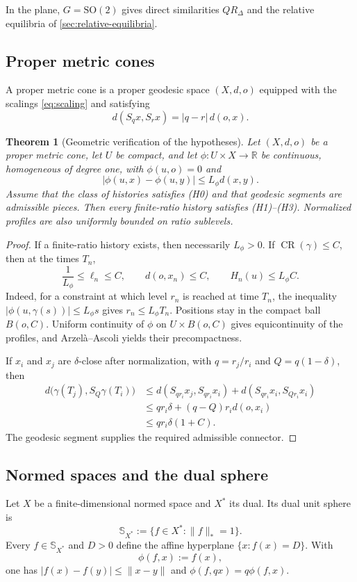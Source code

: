 \documentclass[10pt,a4paper]{article}
\newtheorem{theorem}{Theorem}[section]
\theoremstyle{definition}
\theoremstyle{remark}
\DeclareMathOperator{\CR}{CR}
\newcommand{\R}{\mathbb{R}}
\newcommand{\Sph}{\mathbb{S}}
\newcommand{\norm}[1]{\lVert #1\rVert}
\newcommand{\abs}[1]{\lvert #1\rvert}
\begin{document}
In the plane, $G=\mathrm{SO}(2)$ gives direct similarities $QR_\Delta$ and the relative equilibria of \cref{sec:relative-equilibria}.

\subsection{Proper metric cones}
A proper metric cone is a proper geodesic space $(X,d,o)$ equipped with the scalings \eqref{eq:scaling} and satisfying
\begin{equation}
d(S_qx,S_rx)=\abs{q-r}\,d(o,x).
\label{eq:metric-cone}
\end{equation}

\begin{theorem}[Geometric verification of the hypotheses]
\label{thm:metric-cone}
Let $(X,d,o)$ be a proper metric cone, let $U$ be compact, and let $\phi:U\times X\to\R$ be continuous, homogeneous of degree one, with $\phi(u,o)=0$ and
\[
\abs{\phi(u,x)-\phi(u,y)}\le L_\phi d(x,y).
\]
Assume that the class of histories satisfies \emph{(H0)} and that geodesic segments are admissible pieces. Then every finite-ratio history satisfies \emph{(H1)--(H3)}. Normalized profiles are also uniformly bounded on ratio sublevels.
\end{theorem}

\begin{proof}
If a finite-ratio history exists, then necessarily $L_\phi>0$. If $\CR(\gamma)\le C$, then at the times $T_n$,
\[
\frac{1}{L_\phi}\le\ell_n\le C,
\qquad
d(o,x_n)\le C,
\qquad
H_n(u)\le L_\phi C.
\]
Indeed, for a constraint at which level $r_n$ is reached at time $T_n$, the inequality $\abs{\phi(u,\gamma(s))}\le L_\phi s$ gives $r_n\le L_\phi T_n$. Positions stay in the compact ball $B(o,C)$. Uniform continuity of $\phi$ on $U\times B(o,C)$ gives equicontinuity of the profiles, and Arzel\`a--Ascoli yields their precompactness.

If $x_i$ and $x_j$ are $\delta$-close after normalization, with $q=r_j/r_i$ and $Q=q(1-\delta)$, then
\begin{align*}
d\bigl(\gamma(T_j),S_Q\gamma(T_i)\bigr)
&\le d(S_{qr_i}x_j,S_{qr_i}x_i)
   +d(S_{qr_i}x_i,S_{Qr_i}x_i)\\
&\le qr_i\delta+(q-Q)r_i d(o,x_i)\\
&\le qr_i\delta(1+C).
\end{align*}
The geodesic segment supplies the required admissible connector.
\end{proof}

\subsection{Normed spaces and the dual sphere}
Let $X$ be a finite-dimensional normed space and $X^*$ its dual. Its dual unit sphere is
\[
\Sph_{X^*}:=\{f\in X^*:\norm{f}_*=1\}.
\]
Every $f\in\Sph_{X^*}$ and $D>0$ define the affine hyperplane $\{x:f(x)=D\}$. With
\[
\phi(f,x):=f(x),
\]
one has $\abs{f(x)-f(y)}\le\norm{x-y}$ and $\phi(f,qx)=q\phi(f,x)$.
\end{document}
